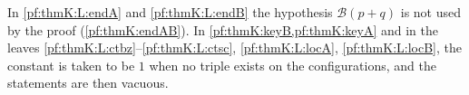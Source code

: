 \begin{remark}\label{pf:thmK:rem:below}
In \ref{pf:thmK:L:endA} and \ref{pf:thmK:L:endB} the hypothesis $\mathcal B(p+q)$ is not used by the proof
(\cref{pf:thmK:endAB}). In \cref{pf:thmK:keyB,pf:thmK:keyA} and in the leaves \ref{pf:thmK:L:ctbz}--\ref{pf:thmK:L:ctsc},
\ref{pf:thmK:L:locA}, \ref{pf:thmK:L:locB}, the constant is taken to be $1$ when no triple exists on the configurations, and
the statements are then vacuous.
\end{remark}
